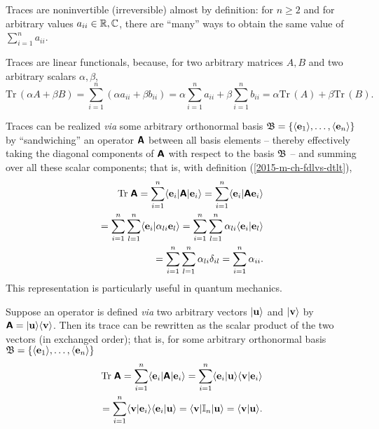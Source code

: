 Traces are noninvertible (irreversible) almost by definition: for $n\ge 2$ and for arbitrary values $a_{ii} \in {\Bbb R}, {\Bbb C}$, there are
``many''  ways to obtain the same value of $ \sum_{i=1}^n a_{ii} $.

Traces are linear functionals, because, for two arbitrary matrices $A,B$
and two arbitrary scalars $\alpha, \beta$,
\begin{equation}
\textrm{Tr}\,(\alpha A + \beta B)
=\sum_{i=1}^n (\alpha a_{ii} + \beta b_{ii})
= \alpha \sum_{i=1}^n a_{ii} + \beta \sum_{i=1}^n  b_{ii}
=
\alpha \textrm{Tr}\,(A)+ \beta \textrm{Tr}\,(B)
.
\end{equation}

Traces can be realized {\it via} some arbitrary orthonormal basis ${\frak B} =\{
 \langle {\bf e}_1\rangle ,
\ldots ,
 \langle {\bf e}_n\rangle
\}$
by ``sandwiching'' an operator $\textsf{\textbf{A}}$ between all basis elements -- thereby effectively taking the diagonal components
of    $\textsf{\textbf{A}}$ with respect to the basis ${\frak B}$ --
and summing over all these scalar components; that is, with definition (\ref{2015-m-ch-fdlvs-dtlt}),
\begin{equation}
\begin{split}
\textrm{Tr}\;\textsf{\textbf{A}}
=\sum_{i=1}^n   \langle {\bf e}_i \vert \textsf{\textbf{A}} \vert {\bf e}_i \rangle
=\sum_{i=1}^n   \langle {\bf e}_i \vert \textsf{\textbf{A}}  {\bf e}_i \rangle  \\
=\sum_{i=1}^n  \sum_{l=1}^n  \langle {\bf e}_i \vert \alpha_{li}  {\bf e}_l \rangle
=\sum_{i=1}^n  \sum_{l=1}^n  \alpha_{li} \langle {\bf e}_i \vert  {\bf e}_l \rangle \\
=\sum_{i=1}^n  \sum_{l=1}^n  \alpha_{li} \delta_{il}
=\sum_{i=1}^n   \alpha_{ii}
.
\end{split}
\end{equation}
This representation is particularly useful in quantum mechanics.


Suppose an operator is defined {\em via} two arbitrary vectors
$\vert {\bf u} \rangle$
and
$\vert {\bf v} \rangle$
by
$\textsf{\textbf{A}} =  \vert {\bf u} \rangle \langle {\bf v} \rangle
$.
Then its trace can be rewritten as the scalar product of the two vectors (in exchanged order); that is,
for  some arbitrary orthonormal basis ${\frak B} =\{
 \langle {\bf e}_1\rangle ,
\ldots ,
 \langle {\bf e}_n\rangle
\}$
\begin{equation}
\begin{split}
\textrm{Tr}\;\textsf{\textbf{A}}
=\sum_{i=1}^n   \langle {\bf e}_i \vert \textsf{\textbf{A}} \vert {\bf e}_i \rangle
=\sum_{i=1}^n   \langle {\bf e}_i \vert {\bf u} \rangle \langle {\bf v} \vert   {\bf e}_i \rangle  \\
=\sum_{i=1}^n   \langle {\bf v} \vert   {\bf e}_i \rangle \langle {\bf e}_i \vert {\bf u} \rangle
=   \langle {\bf v} \vert   {\Bbb I}_n \vert {\bf u} \rangle
=   \langle {\bf v} \vert  {\bf u} \rangle
.
\end{split}
\end{equation}

